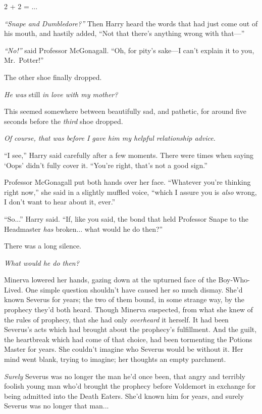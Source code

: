 2 + 2 = ...

\emph{“Snape and Dumbledore?”} Then Harry heard the words that had just come out of his mouth, and hastily added, “Not that there’s anything wrong with that—”

\emph{“No!”} said Professor McGonagall. “Oh, for pity’s sake—I can’t explain it to you, Mr.~Potter!”

The other shoe finally dropped.

\emph{He was} still \emph{in love with my mother?}

This seemed somewhere between beautifully sad, and pathetic, for around five seconds before the \emph{third} shoe dropped.

\emph{Of course, that was before I gave him my helpful relationship advice.}

“I see,” Harry said carefully after a few moments. There were times when saying ‘Oops’ didn’t fully cover it. “You’re right, that’s not a good sign.”

Professor McGonagall put both hands over her face. “Whatever you’re thinking right now,” she said in a slightly muffled voice, “which I assure you is \emph{also} wrong, I don’t want to hear about it, ever.”

“So...” Harry said. “If, like you said, the bond that held Professor Snape to the Headmaster \emph{has} broken... what would he do then?”

There was a long silence.
\sbreak

\emph{What would he do then?}

Minerva lowered her hands, gazing down at the upturned face of the Boy-Who-Lived. One simple question shouldn’t have caused her so much dismay. She’d known Severus for years; the two of them bound, in some strange way, by the prophecy they’d both heard. Though Minerva suspected, from what she knew of the rules of prophecy, that she had only \emph{overheard} it herself. It had been Severus’s acts which had brought about the prophecy’s fulfillment. And the guilt, the heartbreak which had come of that choice, had been tormenting the Potions Master for years. She couldn’t imagine who Severus would be without it. Her mind went blank, trying to imagine; her thoughts an empty parchment.

\emph{Surely} Severus was no longer the man he’d once been, that angry and terribly foolish young man who’d brought the prophecy before Voldemort in exchange for being admitted into the Death Eaters. She’d known him for years, and surely Severus was no longer that man...

